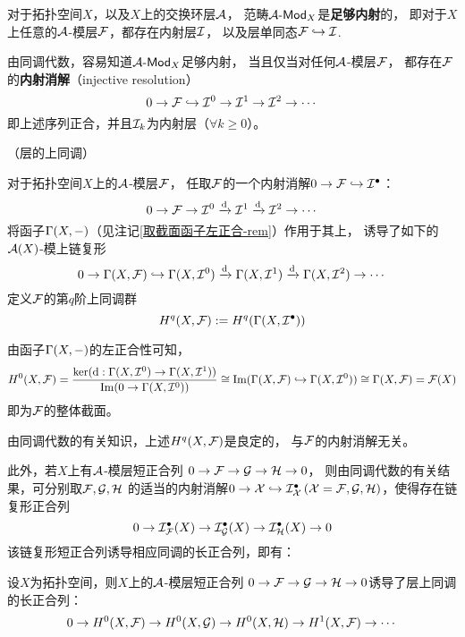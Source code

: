 \begin{thm}对于拓扑空间$X$，以及$X$上的交换环层$\mathcal{A}$，
范畴$\mathcal{A}\operatorname{\!\text{-}\mathsf{Mod}}_X$是\textbf{足够内射}的，
即对于$X$上任意的$\mathcal{A}$-模层$\mathcal{F}$，都存在内射层$\mathcal{I}$，
以及层单同态$\mathcal{F}\hookrightarrow\mathcal{I}$.
\end{thm}
由同调代数，容易知道$\mathcal{A}\operatorname{\!\text{-}\mathsf{Mod}}_X$足够内射，
当且仅当对任何$\mathcal{A}$-模层$\mathcal{F}$，
都存在$\mathcal{F}$的\textbf{内射消解}（injective resolution）
$$
  0\to\mathcal{F}\hookrightarrow\mathcal{I}^0
  \to\mathcal{I}^1\to\mathcal{I}^2\to\cdots
$$
即上述序列正合，并且$\mathcal{I}_k$为内射层（$\forall k\geq 0$）。


\begin{definition}（层的上同调）

对于拓扑空间$X$上的$\mathcal{A}$-模层$\mathcal{F}$，
任取$\mathcal{F}$的一个内射消解$0\to\mathcal{F}\hookrightarrow\mathcal{I}^{\bullet}$：
$$0\to\mathcal{F}\to\mathcal{I}^0\xrightarrow{\mathrm{d}}\mathcal{I}^1\xrightarrow{\mathrm{d}}\mathcal{I}^2\to\cdots$$
将函子$\Gamma(X,-)$（见注记\ref{取截面函子左正合-rem}）作用于其上，
诱导了如下的$\mathcal{A}(X)$-模上链复形
$$0\to\Gamma(X,\mathcal{F})
\hookrightarrow\Gamma(X,\mathcal{I}^0)\xrightarrow{\mathrm{d}}
\Gamma(X,\mathcal{I}^1)\xrightarrow{\mathrm{d}}
\Gamma(X,\mathcal{I}^2)\to\cdots$$
定义$\mathcal{F}$的第$q$阶上同调群
$$H^q(X,\mathcal{F}):=H^q(\Gamma(X,\mathcal{I}^{\bullet}))$$
\end{definition}
由函子$\Gamma(X,-)$的左正合性可知，
$$
  H^0(X,\mathcal{F})
=
  \frac{\ker(\mathrm{d}:\Gamma(X,\mathcal{I}^0)\to\Gamma(X,\mathcal{I}^1))}
       {\operatorname{Im}(0\to\Gamma(X,\mathcal{I}^0))}
\cong
  \operatorname{Im}(\Gamma(X,\mathcal{F})\hookrightarrow\Gamma(X,\mathcal{I}^0))
\cong \Gamma(X,\mathcal{F})=\mathcal{F}(X)
$$
即为$\mathcal{F}$的整体截面。

\begin{rem}
由同调代数的有关知识，上述$H^q(X,\mathcal{F})$是良定的，
与$\mathcal{F}$的内射消解无关。
\end{rem}

此外，若$X$上有$\mathcal{A}$-模层短正合列
$0\to\mathcal{F}\to\mathcal{G}\to\mathcal{H}\to 0$，
则由同调代数的有关结果，可分别取$\mathcal{F},\mathcal{G},\mathcal{H}$
的适当的内射消解$0\to\mathcal{X}\hookrightarrow\mathcal{I}_{\mathcal{X}}^{\bullet}\,
(\mathcal{X}=\mathcal{F},\mathcal{G},\mathcal{H})$，使得存在链复形正合列
$$
 0\to\mathcal{I}_{\mathcal{F}}^{\bullet}(X)
  \to\mathcal{I}_{\mathcal{G}}^{\bullet}(X)
  \to\mathcal{I}_{\mathcal{H}}^{\bullet}(X)\to 0
$$
该链复形短正合列诱导相应同调的长正合列，即有：

\begin{thm}\label{层短正合列诱导上同调长正合列-thm}
设$X$为拓扑空间，则$X$上的$\mathcal{A}$-模层短正合列
$0\to\mathcal{F}\to\mathcal{G}\to\mathcal{H}\to 0$诱导了层上同调的长正合列：
$$
  0\to H^0(X,\mathcal{F})
   \to H^0(X,\mathcal{G})
   \to H^0(X,\mathcal{H})
   \to H^1(X,\mathcal{F})\to\cdots
$$
\end{thm}


